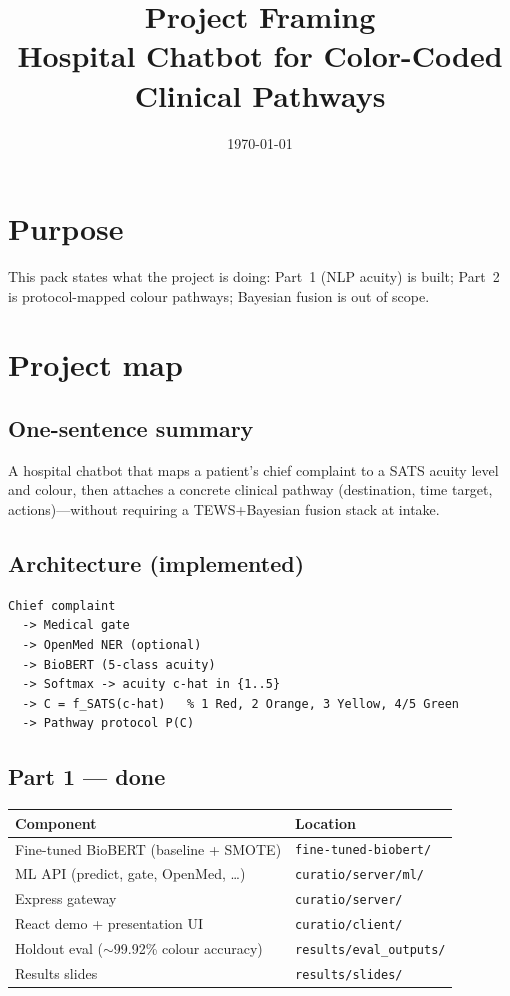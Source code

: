 \documentclass[11pt,a4paper]{article}
\title{Project Framing\\[0.4em]\large Hospital Chatbot for Color-Coded Clinical Pathways}
\author{}
\date{\today}
\begin{document}
\maketitle

\section*{Purpose}
This pack states what the project is doing: Part~1 (NLP acuity) is built; Part~2 is protocol-mapped colour pathways; Bayesian fusion is out of scope.

\section{Project map}

\subsection*{One-sentence summary}
A hospital chatbot that maps a patient's chief complaint to a SATS acuity level and colour, then attaches a concrete clinical pathway (destination, time target, actions)---without requiring a TEWS+Bayesian fusion stack at intake.

\subsection*{Architecture (implemented)}
\begin{verbatim}
Chief complaint
  -> Medical gate
  -> OpenMed NER (optional)
  -> BioBERT (5-class acuity)
  -> Softmax -> acuity c-hat in {1..5}
  -> C = f_SATS(c-hat)   % 1 Red, 2 Orange, 3 Yellow, 4/5 Green
  -> Pathway protocol P(C)
\end{verbatim}

\subsection*{Part 1 --- done}
\begin{tabular}{@{}p{6cm}p{8cm}@{}}
\toprule
\textbf{Component} & \textbf{Location} \\
\midrule
Fine-tuned BioBERT (baseline + SMOTE) & \texttt{fine-tuned-biobert/} \\
ML API (predict, gate, OpenMed, \ldots) & \texttt{curatio/server/ml/} \\
Express gateway & \texttt{curatio/server/} \\
React demo + presentation UI & \texttt{curatio/client/} \\
Holdout eval ($\sim$99.92\% colour accuracy) & \texttt{results/eval\_outputs/} \\
Results slides & \texttt{results/slides/} \\
\bottomrule
\end{tabular}
\end{document}
